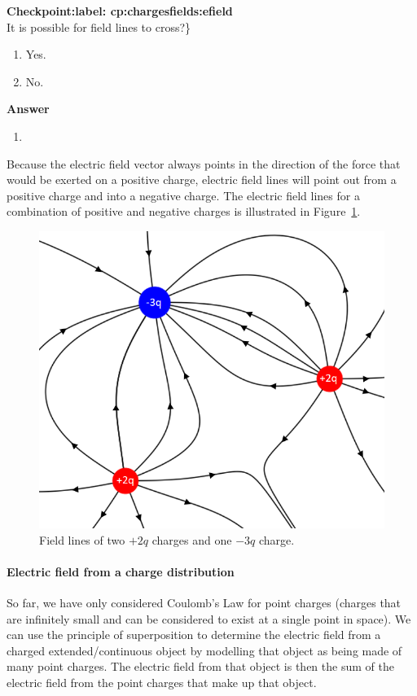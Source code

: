 \begin{framed}
\textbf{Checkpoint:label: cp:chargesfields:efield}\\
It is possible for field lines to cross?\}

\begin{enumerate}
\item Yes.
\item No.
\end{enumerate}

\begin{framed}
\textbf{Answer}\\
\begin{enumerate}[resume]
\item
\end{enumerate}
\end{framed}
\end{framed}

Because the electric field vector always points in the direction of the force that would be exerted on a positive charge, electric field lines will point out from a positive charge and into a negative charge. The electric field lines for a combination of positive and negative charges is illustrated in Figure~\ref{fig:ChargesFields:2pos1neg}.

\begin{figure}[!htbp]
\centering
\includegraphics[width=0.5\linewidth]{files/2pos1neg-bb6e404661ee0b2000eae389bf928df8.png}
\caption[]{Field lines of two $+2q$ charges and one $-3q$ charge.}
\label{fig:ChargesFields:2pos1neg}
\end{figure}

\paragraph{Electric field from a charge distribution}

So far, we have only considered Coulomb's Law for point charges (charges that are infinitely small and can be considered to exist at a single point in space). We can use the principle of superposition to determine the electric field from a charged extended/continuous object by modelling that object as being made of many point charges. The electric field from that object is then the sum of the electric field from the point charges that make up that object.

